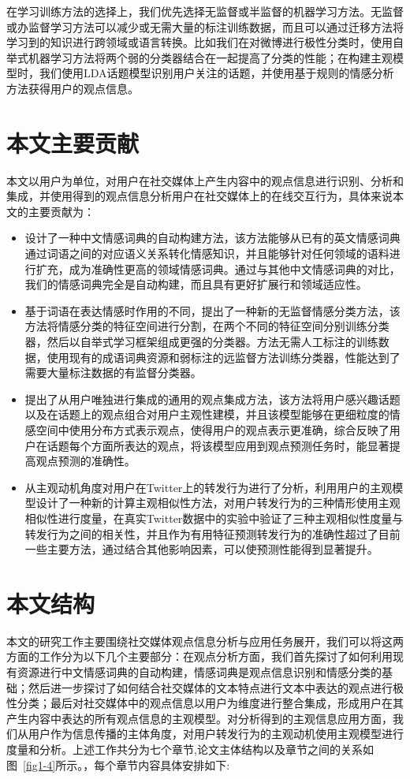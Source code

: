 在学习训练方法的选择上，我们优先选择无监督或半监督的机器学习方法。无监督或办监督学习方法可以减少或无需大量的标注训练数据，而且可以通过迁移方法将学习到的知识进行跨领域或语言转换。比如我们在对微博进行极性分类时，使用自举式机器学习方法将两个弱的分类器结合在一起提高了分类的性能；在构建主观模型时，我们使用LDA话题模型识别用户关注的话题，并使用基于规则的情感分析方法获得用户的观点信息。  

\section{本文主要贡献}
本文以用户为单位，对用户在社交媒体上产生内容中的观点信息进行识别、分析和集成，并使用得到的观点信息分析用户在社交媒体上的在线交互行为，具体来说本文的主要贡献为：
\begin{itemize}
\item 设计了一种中文情感词典的自动构建方法，该方法能够从已有的英文情感词典通过词语之间的对应语义关系转化情感知识，并且能够针对任何领域的语料进行扩充，成为准确性更高的领域情感词典。通过与其他中文情感词典的对比，我们的情感词典完全是自动构建，而且具有更好扩展行和领域适应性。
\item 基于词语在表达情感时作用的不同，提出了一种新的无监督情感分类方法，该方法将情感分类的特征空间进行分割，在两个不同的特征空间分别训练分类器，然后以自举式学习框架组成更强的分类器。方法无需人工标注的训练数据，使用现有的成语词典资源和弱标注的远监督方法训练分类器，性能达到了需要大量标注数据的有监督分类器。
\item 提出了从用户唯独进行集成的通用的观点集成方法，该方法将用户感兴趣话题以及在话题上的观点组合对用户主观性建模，并且该模型能够在更细粒度的情感空间中使用分布方式表示观点，使得用户的观点表示更准确，综合反映了用户在话题每个方面所表达的观点，将该模型应用到观点预测任务时，能显著提高观点预测的准确性。
\item 从主观动机角度对用户在Twitter上的转发行为进行了分析，利用用户的主观模型设计了一种新的计算主观相似性方法，对用户转发行为的三种情形使用主观相似性进行度量，在真实Twitter数据中的实验中验证了三种主观相似性度量与转发行为之间的相关性，并且作为有用特征预测转发行为的准确性超过了目前一些主要方法，通过结合其他影响因素，可以使预测性能得到显著提升。
\end{itemize}

\section{本文结构}
本文的研究工作主要围绕社交媒体观点信息分析与应用任务展开，我们可以将这两方面的工作分为以下几个主要部分：在观点分析方面，我们首先探讨了如何利用现有资源进行中文情感词典的自动构建，情感词典是观点信息识别和情感分类的基础；然后进一步探讨了如何结合社交媒体的文本特点进行文本中表达的观点进行极性分类；最后对社交媒体中的观点信息以用户为维度进行整合集成，形成用户在其产生内容中表达的所有观点信息的主观模型。对分析得到的主观信息应用方面，我们从用户作为信息传播的主体角度，对用户转发行为的主观动机使用主观模型进行度量和分析。上述工作共分为七个章节,论文主体结构以及章节之间的关系如图~\ref{fig1-4}所示。，每个章节内容具体安排如下:

